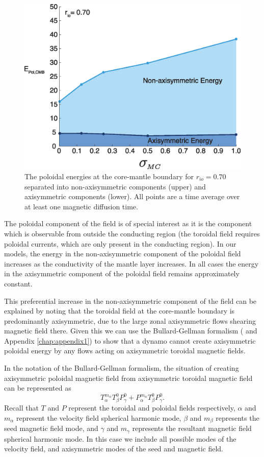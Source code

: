 \begin{figure}
	\centering
        \includegraphics[width=.7\textwidth]{Chapter3/Figures/f3c.eps}
        \caption{The poloidal energies at the core-mantle boundary for $r_{io}=0.70$ separated into non-axisymmetric components (upper) and axisymmetric components (lower). All points are a time average over at least one magnetic diffusion time.}
        \label{fig:cmbenergies70}
\end{figure}

The poloidal component of the field is of special interest as it is the component which is observable from outside the conducting region (the toroidal field requires poloidal currents, which are only present in the conducting region). In our models, the energy in the non-axisymmetric component of the poloidal field increases as the conductivity of the mantle layer increases. In all cases the energy in the axisymmetric component of the poloidal field remains approximately constant.

This preferential increase in the non-axisymmetric component of the field can be explained by noting that the toroidal field at the core-mantle boundary is predominantly axisymmetric, due to the large zonal axisymmetric flows shearing magnetic field there. Given this we can use the Bullard-Gellman formalism (\citet{bullard1954} and Appendix \ref{chap:appendix1}) to show that a dynamo cannot create axisymmetric poloidal energy by any flows acting on axisymmetric toroidal magnetic fields.

In the notation of the Bullard-Gellman formalism, the situation of creating axisymmetric poloidal magnetic field from axisymmetric toroidal magnetic field can be represented as
\begin{equation}
T_{\alpha}^{m_{\alpha}} T_{\beta}^{0} P_{\gamma}^{0} +P_{\alpha}^{m_{\alpha}} T_{\beta}^{0} P_{\gamma}^{0}.
\end{equation}
Recall that $T$ and $P$ represent the toroidal and poloidal fields respectively, $\alpha$ and $m_\alpha$ represent the velocity field spherical harmonic mode, $\beta$ and $m_\beta$ represents the seed magnetic field mode, and $\gamma$ and $m_\gamma$ represents the resultant magnetic field spherical harmonic mode. In this case we include all possible modes of the velocity field, and axisymmetric modes of the seed and magnetic field. 

